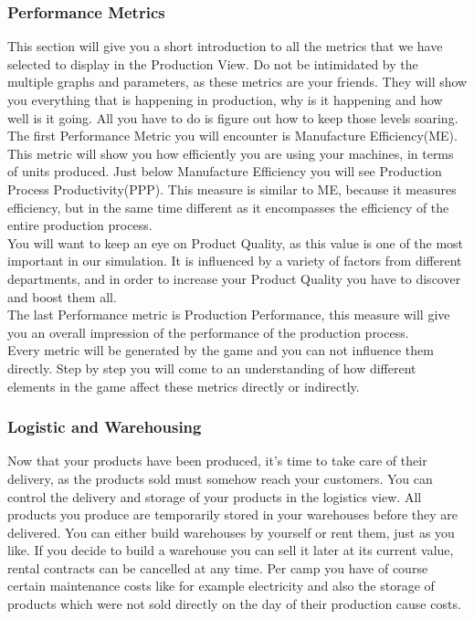 \subsubsection{Performance Metrics}
This section will give you a short introduction to all the metrics that we have selected to display in the Production View. Do not be intimidated by the multiple graphs and parameters, as these metrics are your friends. They will show you everything that is happening in production, why is it happening and how well is it going. All you have to do is figure out how to keep those levels soaring. \\
The first Performance Metric you will encounter is Manufacture Efficiency(ME). This metric will show you how efficiently you are using your machines, in terms of units produced.
Just below Manufacture Efficiency you will see Production Process Productivity(PPP). This measure is similar to ME, because it measures efficiency, but in the same time different as it encompasses the efficiency of the entire production process. \\
You will want to keep an eye on Product Quality, as this value is one of the most important in our simulation. It is influenced by a variety of factors from different departments, and in order to increase your Product Quality you have to discover and  boost them all.\\
The last Performance metric is Production Performance, this measure will give you an overall impression of the performance of the production process.\\
Every metric will be generated by the game and you can not influence them directly. Step by step you will come to an understanding of how different elements in the game affect these metrics directly or indirectly.

\subsubsection{Logistic and Warehousing}
Now that your products have been produced, it's time to take care of their delivery, as the products sold must somehow reach your customers. You can control the delivery and storage of your products in the logistics view. 
All products you produce are temporarily stored in your warehouses before they are delivered. You can either build warehouses by yourself or rent them, just as you like. If you decide to build a warehouse you can sell it later at its current value, rental contracts can be cancelled at any time. Per camp you have of course certain maintenance costs like for example electricity and also the storage of products which were not sold directly on the day of their production cause costs.

